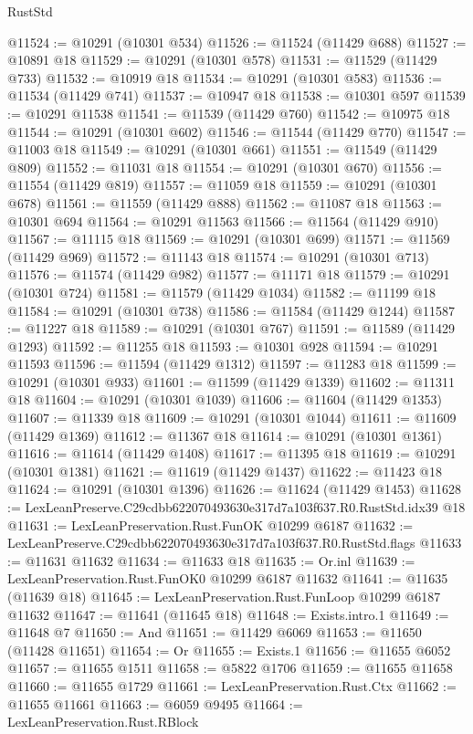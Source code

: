 \begin{lexlean}{RustStd}
\begin{coremodule}
@11524 := @10291 (@10301 @534)
@11526 := @11524 (@11429 @688)
@11527 := @10891 @18
@11529 := @10291 (@10301 @578)
@11531 := @11529 (@11429 @733)
@11532 := @10919 @18
@11534 := @10291 (@10301 @583)
@11536 := @11534 (@11429 @741)
@11537 := @10947 @18
@11538 := @10301 @597
@11539 := @10291 @11538
@11541 := @11539 (@11429 @760)
@11542 := @10975 @18
@11544 := @10291 (@10301 @602)
@11546 := @11544 (@11429 @770)
@11547 := @11003 @18
@11549 := @10291 (@10301 @661)
@11551 := @11549 (@11429 @809)
@11552 := @11031 @18
@11554 := @10291 (@10301 @670)
@11556 := @11554 (@11429 @819)
@11557 := @11059 @18
@11559 := @10291 (@10301 @678)
@11561 := @11559 (@11429 @888)
@11562 := @11087 @18
@11563 := @10301 @694
@11564 := @10291 @11563
@11566 := @11564 (@11429 @910)
@11567 := @11115 @18
@11569 := @10291 (@10301 @699)
@11571 := @11569 (@11429 @969)
@11572 := @11143 @18
@11574 := @10291 (@10301 @713)
@11576 := @11574 (@11429 @982)
@11577 := @11171 @18
@11579 := @10291 (@10301 @724)
@11581 := @11579 (@11429 @1034)
@11582 := @11199 @18
@11584 := @10291 (@10301 @738)
@11586 := @11584 (@11429 @1244)
@11587 := @11227 @18
@11589 := @10291 (@10301 @767)
@11591 := @11589 (@11429 @1293)
@11592 := @11255 @18
@11593 := @10301 @928
@11594 := @10291 @11593
@11596 := @11594 (@11429 @1312)
@11597 := @11283 @18
@11599 := @10291 (@10301 @933)
@11601 := @11599 (@11429 @1339)
@11602 := @11311 @18
@11604 := @10291 (@10301 @1039)
@11606 := @11604 (@11429 @1353)
@11607 := @11339 @18
@11609 := @10291 (@10301 @1044)
@11611 := @11609 (@11429 @1369)
@11612 := @11367 @18
@11614 := @10291 (@10301 @1361)
@11616 := @11614 (@11429 @1408)
@11617 := @11395 @18
@11619 := @10291 (@10301 @1381)
@11621 := @11619 (@11429 @1437)
@11622 := @11423 @18
@11624 := @10291 (@10301 @1396)
@11626 := @11624 (@11429 @1453)
@11628 := LexLeanPreserve.C29cdbb622070493630e317d7a103f637.R0.RustStd.idx39 @18
@11631 := LexLeanPreservation.Rust.FunOK @10299 @6187
@11632 := LexLeanPreserve.C29cdbb622070493630e317d7a103f637.R0.RustStd.flags
@11633 := @11631 @11632
@11634 := @11633 @18
@11635 := Or.inl
@11639 := LexLeanPreservation.Rust.FunOK0 @10299 @6187 @11632
@11641 := @11635 (@11639 @18)
@11645 := LexLeanPreservation.Rust.FunLoop @10299 @6187 @11632
@11647 := @11641 (@11645 @18)
@11648 := Exists.intro.{1}
@11649 := @11648 @7
@11650 := And
@11651 := @11429 @6069
@11653 := @11650 (@11428 @11651)
@11654 := Or
@11655 := Exists.{1}
@11656 := @11655 @6052
@11657 := @11655 @1511
@11658 := @5822 @1706
@11659 := @11655 @11658
@11660 := @11655 @1729
@11661 := LexLeanPreservation.Rust.Ctx
@11662 := @11655 @11661
@11663 := @6059 @9495
@11664 := LexLeanPreservation.Rust.RBlock

\end{coremodule}
\end{lexlean}
